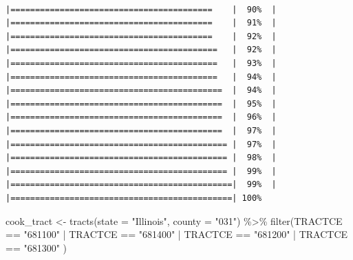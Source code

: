 \documentclass[
  krantz2]{krantz}
\makeatletter
\newenvironment{Shaded}{\begin{snugshade}}{\end{snugshade}}
\newcommand{\AttributeTok}[1]{\textcolor[rgb]{0.61,0.61,0.61}{#1}}
\newcommand{\FunctionTok}[1]{\textcolor[rgb]{0,0,0}{#1}}
\newcommand{\NormalTok}[1]{#1}
\newcommand{\OtherTok}[1]{\textcolor[rgb]{0.37,0.37,0.37}{#1}}
\newcommand{\SpecialCharTok}[1]{\textcolor[rgb]{0,0,0}{#1}}
\newcommand{\StringTok}[1]{\textcolor[rgb]{0.5,0.5,0.5}{#1}}
\newenvironment{kframe}{%
\medskip{}
\setlength{\fboxsep}{.8em}
 \def\at@end@of@kframe{}%
 \ifinner\ifhmode%
  \def\at@end@of@kframe{\end{minipage}}%
  \begin{minipage}{\columnwidth}%
 \fi\fi%
 \def\FrameCommand##1{\hskip\@totalleftmargin \hskip-\fboxsep
 \colorbox{shadecolor}{##1}\hskip-\fboxsep
     \hskip-\linewidth \hskip-\@totalleftmargin \hskip\columnwidth}%
 \MakeFramed {\advance\hsize-\width
   \@totalleftmargin\z@ \linewidth\hsize
   \@setminipage}}%
 {\par\unskip\endMakeFramed%
 \at@end@of@kframe}
\renewenvironment{Shaded}{\begin{kframe}}{\end{kframe}}
\makeatother
\begin{document}
\begin{verbatim}
                             |=========================================    |  90%  |                                                     |=========================================    |  91%  |                                                     |=========================================    |  92%  |                                                     |==========================================   |  92%  |                                                     |==========================================   |  93%  |                                                     |==========================================   |  94%  |                                                     |===========================================  |  94%  |                                                     |===========================================  |  95%  |                                                     |===========================================  |  96%  |                                                     |===========================================  |  97%  |                                                     |============================================ |  97%  |                                                     |============================================ |  98%  |                                                     |============================================ |  99%  |                                                     |=============================================|  99%  |                                                     |=============================================| 100%
\end{verbatim}

\begin{Shaded}
\begin{Highlighting}[]
\NormalTok{cook\_tract }\OtherTok{\textless{}{-}} \FunctionTok{tracts}\NormalTok{(}\AttributeTok{state =} \StringTok{"Illinois"}\NormalTok{, }\AttributeTok{county =} \StringTok{"031"}\NormalTok{) }\SpecialCharTok{\%\textgreater{}\%} 
  \FunctionTok{filter}\NormalTok{(TRACTCE }\SpecialCharTok{==} \StringTok{"681100"} \SpecialCharTok{|}\NormalTok{ TRACTCE }\SpecialCharTok{==} \StringTok{"681400"} \SpecialCharTok{|} 
\NormalTok{           TRACTCE }\SpecialCharTok{==} \StringTok{"681200"} \SpecialCharTok{|}\NormalTok{ TRACTCE }\SpecialCharTok{==} \StringTok{"681300"}\NormalTok{ )}
\end{Highlighting}
\end{Shaded}
\end{document}
